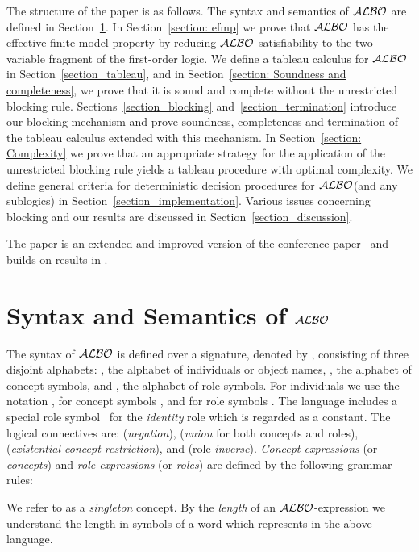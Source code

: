 \documentclass[leqno
,pdflatex
,prodmode
,acmtocl
]{acmsmall}
\newcommand{\mathcmd}[1]{\ensuremath{#1}\xspace}
\newcommand{\dlfont}{\mathcal}
\newcommand{\dl}[1]{\mathcmd{\dlfont{#1}}}
\newcommand{\ALBOid}{\dl{ALBO\smash[t]{\mbox{}}}}
\begin{document}
The structure of the paper is as follows.
The syntax and semantics of \ALBOid are defined in
Section~\ref{section_definition_ALBO}.
In Section~\ref{section: efmp} we prove that \ALBOid has
the effective finite model property by reducing \ALBOid-satisfiability to
the two-variable fragment of the first-order logic.
We define a tableau calculus for \ALBOid in Section~\ref{section_tableau},
and in Section~\ref{section: Soundness and completeness}, we prove that it is sound and complete without the unrestricted
blocking rule.
Sections~\ref{section_blocking} and~\ref{section_termination} introduce
our blocking mechanism and prove soundness, completeness and termination of the
tableau calculus extended with this mechanism.
In Section~\ref{section: Complexity}
we prove that an appropriate strategy for the application of the unrestricted
blocking rule yields a tableau procedure with optimal complexity.
We define general criteria for deterministic decision
procedures for \ALBOid (and any sublogics) in
Section~\ref{section_implementation}.
Various issues concerning blocking and our results are discussed in
Section~\ref{section_discussion}.

The paper is an extended and improved version of the conference
paper~\cite{SchmidtTishkovsky-UTD+-2007} and builds on results in
.

\section{Syntax and Semantics of \protect\ALBOid}
\label{section_definition_ALBO}

The syntax of \ALBOid is defined over a signature, denoted by
, consisting of three disjoint alphabets:
, the alphabet of individuals or object names,
, the alphabet of concept symbols,
and , the alphabet of role symbols.
For individuals we use the notation , 
for concept symbols , and 
for role symbols . 
The language includes a special role symbol~ for
the \emph{identity} role which is regarded as a constant.
The logical connectives are:
 (\emph{negation}),  (\emph{union} for both concepts and roles), 
(\emph{existential concept restriction}), and  (role \emph{inverse}).
\emph{Concept expressions} (or \emph{concepts})  and \emph{role
expressions}
(or \emph{roles})  are defined by the following grammar rules:

We refer to  as a \emph{singleton}
concept.
By the \emph{length} of an \ALBOid-expression  we understand
the length in symbols of a word which represents 
in the above language.
\end{document}
